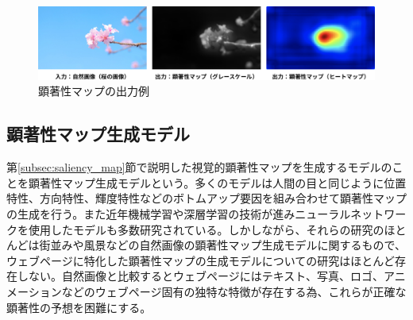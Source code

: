 \begin{figure}[H]
    \centering
    \includegraphics[width=12cm]{figures/03_ex-saliencymap.jpg}
    \caption{顕著性マップの出力例}
    \label{fig_03_ex-saliencymap}
\end{figure}

\subsection{顕著性マップ生成モデル}
\par 第\ref{subsec:saliency_map}節で説明した視覚的顕著性マップを生成するモデルのことを顕著性マップ生成モデルという。多くのモデルは人間の目と同じように位置特性、方向特性、輝度特性などのボトムアップ要因を組み合わせて顕著性マップの生成を行う。また近年機械学習や深層学習の技術が進みニューラルネットワークを使用したモデルも多数研究されている。しかしながら、それらの研究のほとんどは街並みや風景などの自然画像の顕著性マップ生成モデルに関するもので、ウェブページに特化した顕著性マップの生成モデルについての研究はほとんど存在しない。自然画像と比較するとウェブページにはテキスト、写真、ロゴ、アニメーションなどのウェブページ固有の独特な特徴が存在する為、これらが正確な顕著性の予想を困難にする。